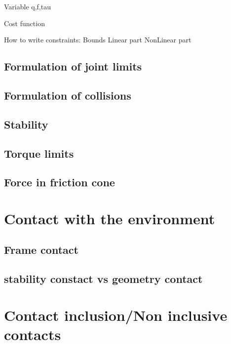 Variable q,f,tau

Cost function

How to write constraints:
Bounds
Linear part
NonLinear part

\subsection{Formulation of joint limits}
\label{sub:formulation_of_joint_limits}

\subsection{Formulation of collisions}
\label{sub:formulation_of_collisions}

\subsection{Stability}
\label{sub:stability}

\subsection{Torque limits}
\label{sub:torque_limits}

\subsection{Force in friction cone}
\label{sub:force_in_friction_cone}

\section{Contact with the environment}
\label{sec:contact_with_the_environment}

\subsection{Frame contact}
\label{sub:frame_contact}

\subsection{stability constact vs geometry contact}
\label{sub:stability_constact_vs_geometry_contact}

\section{Contact inclusion/Non inclusive contacts}
\label{sec:contact_inclusion_non_inclusive_contacts}
















